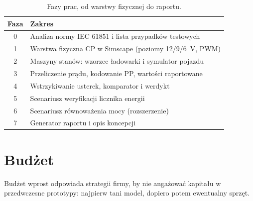 \documentclass[11pt]{article}
\begin{document}
\begin{table}[h]
\centering
\begin{tabularx}{\linewidth}{@{}c X@{}}
\toprule
\textbf{Faza} & \textbf{Zakres} \\
\midrule
0 & Analiza normy IEC 61851 i lista przypadków testowych \\
1 & Warstwa fizyczna CP w Simscape (poziomy 12/9/6~V, PWM) \\
2 & Maszyny stanów: wzorzec ładowarki i symulator pojazdu \\
3 & Przeliczenie prądu, kodowanie PP, wartości raportowane \\
4 & Wstrzykiwanie usterek, komparator i werdykt \\
5 & Scenariusz weryfikacji licznika energii \\
6 & Scenariusz równoważenia mocy (rozszerzenie) \\
7 & Generator raportu i opis koncepcji \\
\bottomrule
\end{tabularx}
\caption{Fazy prac, od warstwy fizycznej do raportu.}
\label{tab:plan}
\end{table}

\section{Budżet}

Budżet wprost odpowiada strategii firmy, by nie angażować kapitału w przedwczesne prototypy: najpierw tani model, dopiero potem ewentualny sprzęt.
\end{document}
